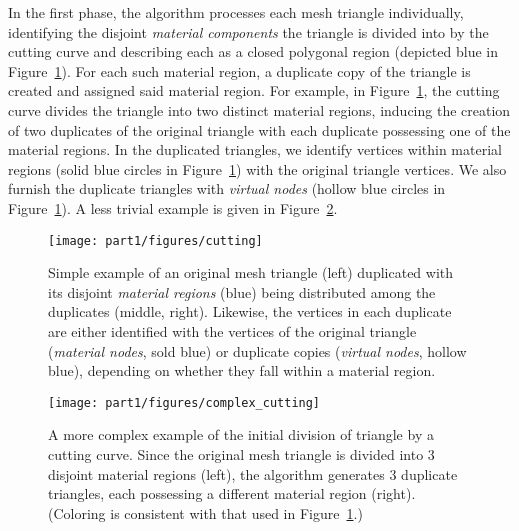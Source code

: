 In the first phase, the algorithm processes each mesh triangle individually, identifying the disjoint \emph{material components} the triangle is divided into by the cutting curve and describing each as a closed polygonal region (depicted blue in Figure~\ref{fig:pt1.cutting.triangle.2}). For each such material region, a duplicate copy of the triangle is created and assigned said material region. For example, in Figure~\ref{fig:pt1.cutting.triangle.2}, the cutting curve divides the triangle into two distinct material regions, inducing the creation of two duplicates of the original triangle with each duplicate possessing one of the material regions. In the duplicated triangles, we identify vertices within material regions (solid blue circles in Figure~\ref{fig:pt1.cutting.triangle.2}) with the original triangle vertices. We also furnish the duplicate triangles with \emph{virtual nodes} (hollow blue circles in Figure~\ref{fig:pt1.cutting.triangle.2}). A less trivial example is given in Figure~\ref{fig:pt1.cutting.triangle.3}.

\setlength{\figureheight}{0.25\columnwidth}
\begin{figure}[htbp]
\begin{center}
\texttt{[image: part1/figures/cutting]}
\caption{Simple example of an original mesh triangle (left) duplicated with its disjoint \emph{material regions} (blue) being distributed among the duplicates (middle, right). Likewise, the vertices in each duplicate are either identified with the vertices of the original triangle (\emph{material nodes}, sold blue) or duplicate copies (\emph{virtual nodes}, hollow blue), depending on whether they fall within a material region.}
\label{fig:pt1.cutting.triangle.2}
\end{center}
\end{figure}

\setlength{\figureheight}{0.25\columnwidth}
\begin{figure}[htbp]
\begin{center}
\texttt{[image: part1/figures/complex\_cutting]}
\caption{A more complex example of the initial division of triangle by a cutting curve. Since the original mesh triangle is divided into $3$ disjoint material regions (left), the algorithm generates $3$ duplicate triangles, each possessing a different material region (right). (Coloring is consistent with that used in Figure~\ref{fig:pt1.cutting.triangle.2}.)}
\label{fig:pt1.cutting.triangle.3}
\end{center}
\end{figure}

